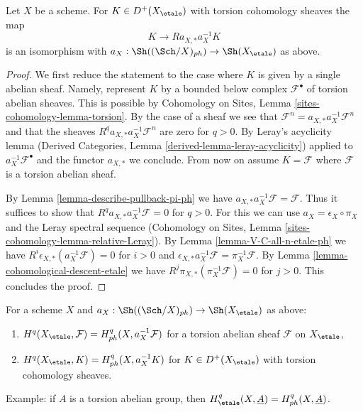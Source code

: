 \begin{lemma}
\label{lemma-cohomological-descent-etale-ph}
Let $X$ be a scheme. For $K \in D^+(X_\etale)$ with torsion cohomology
sheaves the map
$$
K \longrightarrow Ra_{X, *}a_X^{-1}K
$$
is an isomorphism with $a_X : \Sh((\Sch/X)_{ph}) \to \Sh(X_\etale)$ as above.
\end{lemma}

\begin{proof}
We first reduce the statement to the case where
$K$ is given by a single abelian sheaf. Namely, represent $K$
by a bounded below complex $\mathcal{F}^\bullet$ of torsion
abelian sheaves. This is possible by Cohomology on Sites, Lemma
\ref{sites-cohomology-lemma-torsion}. By the case of a
sheaf we see that
$\mathcal{F}^n = a_{X, *} a_X^{-1} \mathcal{F}^n$
and that the sheaves $R^qa_{X, *}a_X^{-1}\mathcal{F}^n$
are zero for $q > 0$. By Leray's acyclicity lemma
(Derived Categories, Lemma \ref{derived-lemma-leray-acyclicity})
applied to $a_X^{-1}\mathcal{F}^\bullet$
and the functor $a_{X, *}$ we conclude. From now on assume $K = \mathcal{F}$
where $\mathcal{F}$ is a torsion abelian sheaf.

\medskip\noindent
By Lemma \ref{lemma-describe-pullback-pi-ph} we have
$a_{X, *}a_X^{-1}\mathcal{F} = \mathcal{F}$. Thus it suffices to show that
$R^qa_{X, *}a_X^{-1}\mathcal{F} = 0$ for $q > 0$.
For this we can use $a_X = \epsilon_X \circ \pi_X$ and
the Leray spectral sequence
(Cohomology on Sites, Lemma \ref{sites-cohomology-lemma-relative-Leray}).
By Lemma \ref{lemma-V-C-all-n-etale-ph}
we have $R^i\epsilon_{X, *}(a_X^{-1}\mathcal{F}) = 0$ for $i > 0$
and $\epsilon_{X, *}a_X^{-1}\mathcal{F} = \pi_X^{-1}\mathcal{F}$.
By Lemma \ref{lemma-cohomological-descent-etale} we have
$R^j\pi_{X, *}(\pi_X^{-1}\mathcal{F}) = 0$ for $j > 0$.
This concludes the proof.
\end{proof}

\begin{lemma}
\label{lemma-compare-cohomology-etale-ph}
For a scheme $X$ and $a_X : \Sh((\Sch/X)_{ph}) \to \Sh(X_\etale)$
as above:
\begin{enumerate}
\item $H^q(X_\etale, \mathcal{F}) = H^q_{ph}(X, a_X^{-1}\mathcal{F})$
for a torsion abelian sheaf $\mathcal{F}$ on $X_\etale$,
\item $H^q(X_\etale, K) = H^q_{ph}(X, a_X^{-1}K)$
for $K \in D^+(X_\etale)$ with torsion cohomology sheaves.
\end{enumerate}
Example: if $A$ is a torsion abelian group, then
$H^q_\etale(X, \underline{A}) = H^q_{ph}(X, \underline{A})$.
\end{lemma}

